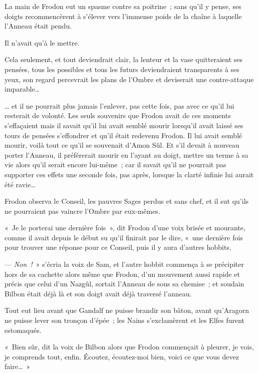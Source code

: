 La main de Frodon eut un spasme contre sa poitrine~; sans qu'il y pense, ses doigts recommencèrent à s'élever vers l'immense poids de la chaîne à laquelle l'Anneau était pendu.

Il n'avait qu'à le mettre.

Cela seulement, et tout deviendrait clair, la lenteur et la vase quitteraient ses pensées, tous les possibles et tous les futurs deviendraient transparents à ses yeux, son regard percevrait les plans de l'Ombre et deviserait une contre-attaque imparable…

… et il ne pourrait plus jamais l'enlever, pas cette fois, pas avec ce qu'il lui resterait de volonté. Les seuls souvenirs que Frodon avait de ces moments s'effaçaient mais il savait qu'il lui avait semblé mourir lorsqu'il avait laissé ses tours de pensées s'effondrer et qu'il était redevenu Frodon. Il lui avait semblé mourir, voilà tout ce qu'il se souvenait d'Amon Sûl. Et s'il devait à nouveau porter l'Anneau, il préférerait mourir en l'ayant au doigt, mettre un terme à sa vie alors qu'il serait encore lui-même~; car il savait qu'il ne pourrait pas supporter ces effets une seconde fois, pas après, lorsque la clarté infinie lui aurait été ravie…

Frodon observa le Conseil, les pauvres Sages perdus et sans chef, et il sut qu'ils ne pourraient pas vaincre l'Ombre par eux-mêmes.

«~Je le porterai une dernière fois~», dit Frodon d'une voix brisée et mourante, comme il avait depuis le début su qu'il finirait par le dire, «~une dernière fois pour trouver une réponse pour ce Conseil, puis il y aura d'autres hobbits.

--- \emph{Non~!}~» s'écria la voix de Sam, et l'autre hobbit commença à se précipiter hors de sa cachette alors même que Frodon, d'un mouvement aussi rapide et précis que celui d'un Nazgûl, sortait l'Anneau de sous sa chemise~; et soudain Bilbon était déjà là et son doigt avait déjà traversé l'anneau.

Tout eut lieu avant que Gandalf ne puisse brandir son bâton, avant qu'Aragorn ne puisse lever son tronçon d'épée~; les Nains s'exclamèrent et les Elfes furent estomaqués.

«~Bien sûr, dit la voix de Bilbon alors que Frodon commençait à pleurer, je vois, je comprends tout, enfin. Écoutez, écoutez-moi bien, voici ce que vous devez faire…~»


